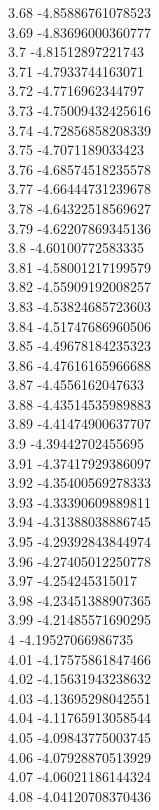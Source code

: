 {3.68	-4.85886761078523\\
3.69	-4.83696000360777\\
3.7	-4.81512897221743\\
3.71	-4.7933744163071\\
3.72	-4.7716962344797\\
3.73	-4.75009432425616\\
3.74	-4.72856858208339\\
3.75	-4.7071189033423\\
3.76	-4.68574518235578\\
3.77	-4.66444731239678\\
3.78	-4.64322518569627\\
3.79	-4.62207869345136\\
3.8	-4.60100772583335\\
3.81	-4.58001217199579\\
3.82	-4.55909192008257\\
3.83	-4.53824685723603\\
3.84	-4.51747686960506\\
3.85	-4.49678184235323\\
3.86	-4.47616165966688\\
3.87	-4.4556162047633\\
3.88	-4.43514535989883\\
3.89	-4.41474900637707\\
3.9	-4.39442702455695\\
3.91	-4.37417929386097\\
3.92	-4.35400569278333\\
3.93	-4.33390609889811\\
3.94	-4.31388038886745\\
3.95	-4.29392843844974\\
3.96	-4.27405012250778\\
3.97	-4.254245315017\\
3.98	-4.23451388907365\\
3.99	-4.21485571690295\\
4	-4.19527066986735\\
4.01	-4.17575861847466\\
4.02	-4.15631943238632\\
4.03	-4.13695298042551\\
4.04	-4.11765913058544\\
4.05	-4.09843775003745\\
4.06	-4.07928870513929\\
4.07	-4.06021186144324\\
4.08	-4.04120708370436\\
}
